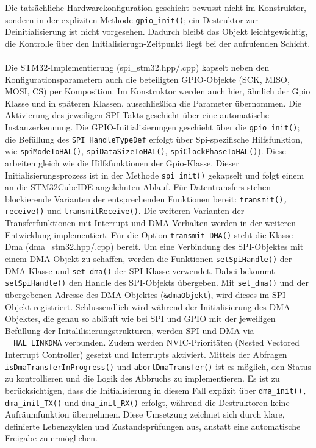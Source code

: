 Die tatsächliche Hardwarekonfiguration geschieht bewusst nicht im Konstruktor, sondern in der expliziten Methode \texttt{gpio\_init()}; ein Destruktor zur Deinitialisierung ist nicht vorgesehen.
Dadurch bleibt das Objekt leichtgewichtig, die Kontrolle über den Initialisierugn-Zeitpunkt liegt bei der aufrufenden Schicht.
\\
\\
Die STM32-Implementierung (spi\_stm32.hpp/.cpp) kapselt neben den Konfigurationsparametern auch die beteiligten GPIO-Objekte (SCK, MISO, MOSI, CS) per Komposition. 
Im Konstruktor werden auch hier, ähnlich der Gpio Klasse und in späteren Klassen, ausschließlich die Parameter übernommen. 
Die Aktivierung des jeweiligen SPI-Takts geschieht über eine automatische Instanzerkennung.
Die GPIO-Initialisierungen geschieht über die \texttt{gpio\_init()}; 
die Befüllung des \texttt{SPI\_HandleTypeDef}  erfolgt über Spi-spezifische Hilfsfunktion, wie \texttt{spiModeToHAL()}, \texttt{spiDataSizeToHAL()}, \texttt{spiClockPhaseToHAL()}). 
Diese arbeiten gleich wie die Hilfsfunktionen der Gpio-Klasse.
Dieser Initialisierungsprozess ist in der Methode \texttt{spi\_init()} gekapselt und folgt einem an die STM32CubeIDE angelehnten Ablauf.
Für Datentransfers stehen blockierende Varianten der entsprechenden Funktionen bereit: \texttt{transmit(), receive()} und \texttt{transmitReceive()}.%
Die weiteren Varianten der Transferfunktionen mit Interrupt und DMA-Verhalten werden in der weiteren Entwicklung implementiert.
Für die Option \texttt{transmit\_DMA()} steht die Klasse Dma (dma\_stm32.hpp/.cpp) bereit.
Um eine Verbindung des SPI-Objektes mit einem DMA-Objekt zu schaffen, werden die Funktionen \texttt{setSpiHandle()} der DMA-Klasse und \texttt{set\_dma()} der SPI-Klasse verwendet.
Dabei bekommt \texttt{setSpiHandle()} den Handle des SPI-Objekts übergeben.
Mit \texttt{set\_dma()} und der übergebenen Adresse des DMA-Objektes (\texttt{\&dmaObjekt}), wird dieses im SPI-Objekt registriert.
Schlussendlich wird während der Initialisierung des DMA-Objektes, die genau so abläuft wie bei SPI und GPIO mit der jeweiligen Befüllung der Initalilisierungstrukturen, werden SPI und DMA via \texttt{\_\_HAL\_LINKDMA} verbunden.
Zudem werden NVIC-Prioritäten (Nested Vectored Interrupt Controller) gesetzt und Interrupts aktiviert.
Mittels der Abfragen \texttt{isDmaTransferInProgress()} und \texttt{abortDmaTransfer()} ist es möglich, den Status zu kontrollieren und die Logik des Abbruchs zu implementieren.
Es ist zu berücksichtigen, dass die Initialisierung in diesem Fall explizit über \texttt{dma\_init(), dma\_init\_TX()} und \texttt{dma\_init\_RX()} erfolgt, während die Destruktoren keine Aufräumfunktion übernehmen.
Diese Umsetzung zeichnet sich durch klare, definierte Lebenszyklen und Zustandsprüfungen aus, anstatt eine automatische Freigabe zu ermöglichen.



